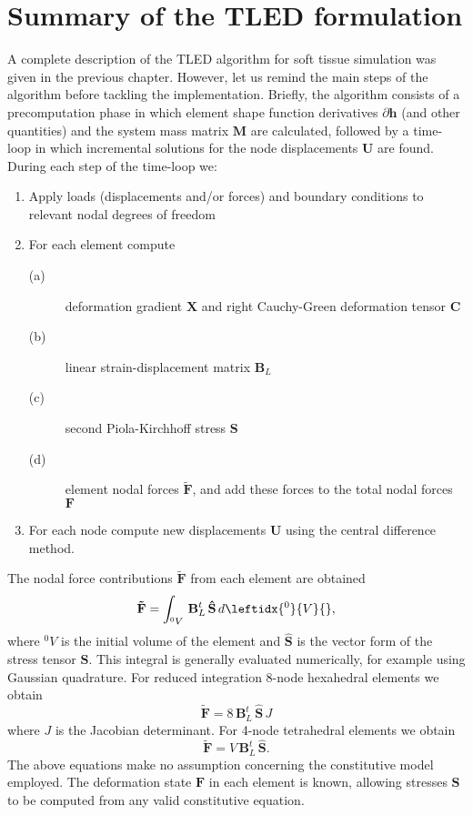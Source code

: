 \section{Summary of the TLED formulation}
A complete description of the TLED algorithm for soft tissue simulation was given in the previous chapter. However, let us remind the main steps of the algorithm before tackling the implementation. Briefly, the algorithm consists of a precomputation phase in which element shape function derivatives $ \partial \mathbf{h} $ (and other quantities) and the system mass matrix $ \mathbf{M} $ are calculated, followed by a time-loop in which incremental solutions for the node displacements $ \mathbf{U} $ are found. During each step of the time-loop we:
\begin{enumerate}
\item Apply loads (displacements and/or forces) and boundary conditions to relevant nodal degrees of freedom
\item For each element compute
\begin{description}
\item[(a)] deformation gradient $ \mathbf{X} $ and right Cauchy-Green deformation tensor $ \mathbf{C} $
\item[(b)] linear strain-displacement matrix $ \mathbf{B}_L $
\item[(c)] second Piola-Kirchhoff stress $ \mathbf{S} $
\item[(d)] element nodal forces $ \mathbf{\tilde{F}} $, and add these forces to the total nodal forces $ \mathbf{F} $
\end{description}
\item For each node compute new displacements $ \mathbf{U} $ using the central difference method.
\end{enumerate}

\bigskip

\noindent The nodal force contributions $ \mathbf{\tilde{F}} $ from each element are obtained 
\begin{equation}
\mathbf{\tilde{F}} = \int_{^0 V} \, \mathbf{B}_L^t \, \mathbf{\hat{S}} \, d\leftidx{^0}{ V }{},
\end{equation}
where $ ^0 V $ is the initial volume of the element and $ \mathbf{\hat{S}} $ is the vector form of the stress tensor $ \mathbf{S} $. This integral is generally evaluated numerically, for example using Gaussian quadrature. For reduced integration 8-node hexahedral elements we obtain
\begin{equation}
\mathbf{\tilde{F}} = 8 \, \mathbf{B}_L^t \, \mathbf{\hat{S}} \, J
\end{equation}
where $ J $ is the Jacobian determinant. For 4-node tetrahedral elements we obtain
\begin{equation}
\mathbf{\tilde{F}} = V \, \mathbf{B}_L^t \, \mathbf{\hat{S}}.
\end{equation}
The above equations make no assumption concerning the constitutive model employed. The deformation state $ \mathbf{F} $ in each element is known, allowing stresses $ \mathbf{S} $ to be computed from any valid constitutive equation. 


